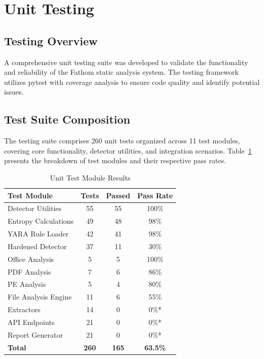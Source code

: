 
\section{Unit Testing}

\subsection{Testing Overview}

A comprehensive unit testing suite was developed to validate the functionality and reliability of the Fathom static analysis system. The testing framework utilizes pytest with coverage analysis to ensure code quality and identify potential issues.

\subsection{Test Suite Composition}

The testing suite comprises 260 unit tests organized across 11 test modules, covering core functionality, detector utilities, and integration scenarios. Table~\ref{tab:test_modules} presents the breakdown of test modules and their respective pass rates.

\begin{table}[h]
\centering
\caption{Unit Test Module Results}
\label{tab:test_modules}
\begin{tabular}{|l|c|c|c|}
\hline
\textbf{Test Module} & \textbf{Tests} & \textbf{Passed} & \textbf{Pass Rate} \\
\hline
Detector Utilities & 55 & 55 & 100\% \\
Entropy Calculations & 49 & 48 & 98\% \\
YARA Rule Loader & 42 & 41 & 98\% \\
Hardened Detector & 37 & 11 & 30\% \\
Office Analysis & 5 & 5 & 100\% \\
PDF Analysis & 7 & 6 & 86\% \\
PE Analysis & 5 & 4 & 80\% \\
File Analysis Engine & 11 & 6 & 55\% \\
Extractors & 14 & 0 & 0\%* \\
API Endpoints & 21 & 0 & 0\%* \\
Report Generator & 21 & 0 & 0\%* \\
\hline
\textbf{Total} & \textbf{260} & \textbf{165} & \textbf{63.5\%} \\
\hline
\end{tabular}
\end{table}


